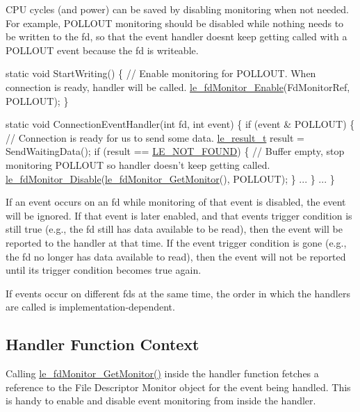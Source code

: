 C\+P\+U cycles (and power) can be saved by disabling monitoring when not needed. For example, {\ttfamily P\+O\+L\+L\+O\+U\+T} monitoring should be disabled while nothing needs to be written to the fd, so that the event handler doesn\textquotesingle{}t keep getting called with a {\ttfamily P\+O\+L\+L\+O\+U\+T} event because the fd is writeable.


\begin{DoxyCode}
\textcolor{keyword}{static} \textcolor{keywordtype}{void} StartWriting()
\{
    \textcolor{comment}{// Enable monitoring for POLLOUT.  When connection is ready, handler will be called.}
    \hyperlink{le__fd_monitor_8h_a497aee19dbedadf884f404958713b414}{le\_fdMonitor\_Enable}(FdMonitorRef, POLLOUT);
\}

\textcolor{keyword}{static} \textcolor{keywordtype}{void} ConnectionEventHandler(\textcolor{keywordtype}{int} fd, \textcolor{keywordtype}{int} event)
\{
    \textcolor{keywordflow}{if} (event & POLLOUT)
    \{
        \textcolor{comment}{// Connection is ready for us to send some data.}
        \hyperlink{le__basics_8h_a1cca095ed6ebab24b57a636382a6c86c}{le\_result\_t} result = SendWaitingData();
        \textcolor{keywordflow}{if} (result == \hyperlink{le__basics_8h_a1cca095ed6ebab24b57a636382a6c86ca77a7505b0443df2fa1bab375c7267637}{LE\_NOT\_FOUND})
        \{
            \textcolor{comment}{// Buffer empty, stop monitoring POLLOUT so handler doesn't keep getting called.}
            \hyperlink{le__fd_monitor_8h_ada2b1023507b99e9247175dd3ffe5d48}{le\_fdMonitor\_Disable}(\hyperlink{le__fd_monitor_8h_a688da8b3627d20b01795dfa1ae46bb78}{le\_fdMonitor\_GetMonitor}(), 
      POLLOUT);
        \}
        ...
    \}
    ...
\}
\end{DoxyCode}


If an event occurs on an fd while monitoring of that event is disabled, the event will be ignored. If that event is later enabled, and that event\textquotesingle{}s trigger condition is still true (e.\+g., the fd still has data available to be read), then the event will be reported to the handler at that time. If the event trigger condition is gone (e.\+g., the fd no longer has data available to read), then the event will not be reported until its trigger condition becomes true again.

If events occur on different fds at the same time, the order in which the handlers are called is implementation-\/dependent.\hypertarget{c_fd_monitor_c_fdMonitorHandlerContext}{}\subsection{Handler Function Context}\label{c_fd_monitor_c_fdMonitorHandlerContext}
Calling \hyperlink{le__fd_monitor_8h_a688da8b3627d20b01795dfa1ae46bb78}{le\+\_\+fd\+Monitor\+\_\+\+Get\+Monitor()} inside the handler function fetches a reference to the File Descriptor Monitor object for the event being handled. This is handy to enable and disable event monitoring from inside the handler.

